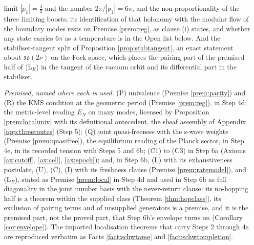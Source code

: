 \documentclass[11pt]{article}
\theoremstyle{definition}
\newcommand{\EN}{E_{N}}
\begin{document}
limit $|p_1| = \tfrac13$ and the number $2\pi/|p_1| = 6\pi$, and the non-proportionality of the three limiting boosts; its identification of that holonomy with the modular flow of the boundary modes rests on Premise \ref{prem:reg}, as clause (i) states, and whether any state carries $6\pi$ as a temperature is in the Open list below. And the stabiliser-tangent split of Proposition \ref{prop:stabtangent}, an exact statement about $\mathfrak{so}(2\nu)$ on the Fock space, which places the pairing part of the premised half of (L$_E$) in the tangent of the vacuum orbit and its differential part in the stabiliser.

\emph{Premised, named where each is used.} (P) univalence (Premise \ref{prem:parity}) and (R) the KMS condition at the geometric period (Premise \ref{prem:reg}), in Step 4d; the metric-level reading $\EN$ on many modes, licensed by Proposition \ref{prem:localuniv} with its definitional antecedent, the sheaf assembly of Appendix \ref{app:threeroutes} (Step 5); (Q) joint quasi-freeness with the s-wave weights (Premise \ref{prem:quasifree}), the equilibrium reading of the Planck sector, in Step 4e, in its recorded tension with Steps 5 and 6b; (C1) to (C3) in Step 6a (Axioms \ref{ax:cutoff}, \ref{ax:cell}, \ref{ax:epoch}); and, in Step 6b, (L) with its exhaustiveness postulate, (U), (C), (I) with its freshness clause (Premise \ref{prem:ratemodel}), and (L$_E$), stated as Premise \ref{prem:local} in Step 4d and used in Step 6b as full diagonality in the joint number basis with the never-return clause: its no-hopping half is a theorem within the supplied class (Theorem \ref{thm:hopclass}), its exclusion of pairing terms and of unsupplied generators is a premise, and it is the premised part, not the proved part, that Step 6b's envelope turns on (Corollary \ref{cor:envelope}). The imported localisation theorems that carry Steps 2 through 4a are reproduced verbatim as Facts \ref{fact:schwtame} and \ref{fact:schwcompletion}.
\end{document}
